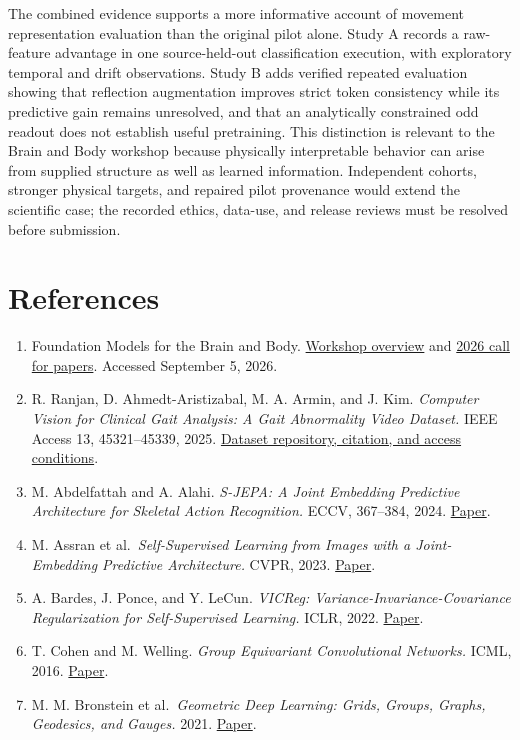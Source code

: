 \documentclass[11pt,letterpaper]{article}
\providecommand{\tightlist}{\setlength{\itemsep}{0pt}\setlength{\parskip}{0pt}}
\begin{document}
The combined evidence supports a more informative account of movement
representation evaluation than the original pilot alone. Study A records
a raw-feature advantage in one source-held-out classification execution,
with exploratory temporal and drift observations. Study B adds verified
repeated evaluation showing that reflection augmentation improves strict
token consistency while its predictive gain remains unresolved, and that
an analytically constrained odd readout does not establish useful
pretraining. This distinction is relevant to the Brain and Body workshop
because physically interpretable behavior can arise from supplied
structure as well as learned information. Independent cohorts, stronger
physical targets, and repaired pilot provenance would extend the
scientific case; the recorded ethics, data-use, and release reviews must
be resolved before submission.


\section{References}\label{references}

\begin{enumerate}
\def\labelenumi{\arabic{enumi}.}
\tightlist
\item
  Foundation Models for the Brain and Body.
  \href{https://brainbodyfm-workshop.github.io/}{Workshop overview} and
  \href{https://brainbodyfm-workshop.github.io/call-for-papers.html}{2026
  call for papers}. Accessed September 5, 2026.
\item
  R. Ranjan, D. Ahmedt-Aristizabal, M. A. Armin, and J. Kim.
  \emph{Computer Vision for Clinical Gait Analysis: A Gait Abnormality
  Video Dataset.} IEEE Access 13, 45321--45339, 2025.
  \href{https://github.com/Rahmyyy/GAVD}{Dataset repository, citation,
  and access conditions}.
\item
  M. Abdelfattah and A. Alahi. \emph{S-JEPA: A Joint Embedding
  Predictive Architecture for Skeletal Action Recognition.} ECCV,
  367--384, 2024.
  \href{https://www.ecva.net/papers/eccv_2024/papers_ECCV/papers/04755.pdf}{Paper}.
\item
  M. Assran et al.~\emph{Self-Supervised Learning from Images with a
  Joint-Embedding Predictive Architecture.} CVPR, 2023.
  \href{https://arxiv.org/abs/2301.08243}{Paper}.
\item
  A. Bardes, J. Ponce, and Y. LeCun. \emph{VICReg:
  Variance-Invariance-Covariance Regularization for Self-Supervised
  Learning.} ICLR, 2022. \href{https://arxiv.org/abs/2105.04906}{Paper}.
\item
  T. Cohen and M. Welling. \emph{Group Equivariant Convolutional
  Networks.} ICML, 2016.
  \href{https://proceedings.mlr.press/v48/cohenc16.html}{Paper}.
\item
  M. M. Bronstein et al.~\emph{Geometric Deep Learning: Grids, Groups,
  Graphs, Geodesics, and Gauges.} 2021.
  \href{https://arxiv.org/abs/2104.13478}{Paper}.
\end{enumerate}
\end{document}
